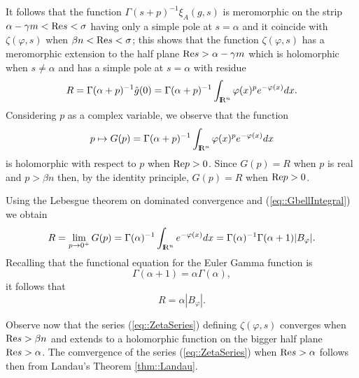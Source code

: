 \documentclass[12pt,a4paper]{amsart}
\begin{document}
{It follows that the function
$\Gamma({s}+{p})^{-1}{{\xi}_{{A}}\left({g},{s}\right)}$
is meromorphic on the strip
${\alpha}-{\gamma}{m}<{\mathop{\rm Re}\nolimits}{s}<{\sigma}$
having only a simple pole at ${s}={\alpha}$
and it coincide with ${\zeta}({\varphi},{s})$ when
${\beta}{n}<{\mathop{\rm Re}\nolimits}{s}<{\sigma}$;
this shows that the function ${\zeta}({\varphi},{s})$
has a meromorphic extension to the half plane
${\mathop{\rm Re}\nolimits}{s}>{\alpha}-{\gamma}{m}$
which is holomorphic when ${s}\neq{\alpha}$ and
has a simple pole at ${s}={\alpha}$
with residue
\begin{equation}\nonumber
	R=\Gamma({\alpha}+{p})^{-1}\hat{g}(0)=
		\Gamma({\alpha}+{p})^{-1}
		\int_{{{\rm I\kern-.185em R}}^{n}}{\varphi}({x})^{p} e^{-{\varphi}({x})}d{x}.
\end{equation}
Considering ${p}$ as a complex variable,
we observe that the function
\begin{equation}\nonumber
	{p}\mapsto{G}({p})=
		\Gamma({\alpha}+{p})^{-1}
		\int_{{{\rm I\kern-.185em R}}^{n}}{\varphi}({x})^{p} e^{-{\varphi}({x})}d{x}
\end{equation}
is holomorphic with respect to ${p}$ when ${\mathop{\rm Re}\nolimits}{p}>0$.
Since ${G}({p})=R$ when ${p}$ is real and ${p}>{\beta}{n}$
then, by the identity principle,
${G}({p})=R$ when ${\mathop{\rm Re}\nolimits}{p}>0$.

Using the Lebesgue theorem on dominated convergence and (\ref{eq::GbellIntegral})
we obtain
\begin{equation}\nonumber
	R=\lim_{{p}\to0^+}{G}({p})=
	\Gamma({\alpha})^{-1}\int_{{{\rm I\kern-.185em R}}^{n}}e^{-{\varphi}({x})}d{x}
	=\Gamma({\alpha})^{-1}\Gamma({\alpha}+1)|{B}_{\varphi}|.
\end{equation}
Recalling that the functional equation for the Euler Gamma function is
\begin{equation}\nonumber
	\Gamma({\alpha}+1)={\alpha}\Gamma({\alpha}),
\end{equation}
it follows that
\begin{equation}\nonumber
	R={\alpha}|{B}_{\varphi}|.
\end{equation}

Observe now that the series (\ref{eq::ZetaSeries}) defining
${\zeta}({\varphi},{s})$
converges when ${\mathop{\rm Re}\nolimits}{s}>{\beta}{n}$
and extends to a holomorphic function on the bigger half plane
${\mathop{\rm Re}\nolimits}{s}>{\alpha}$.
The comvergence of the series (\ref{eq::ZetaSeries}) when
${\mathop{\rm Re}\nolimits}{s}>{\alpha}$
follows then from Landau's Theorem \ref{thm::Landau}.

}
\end{document}

